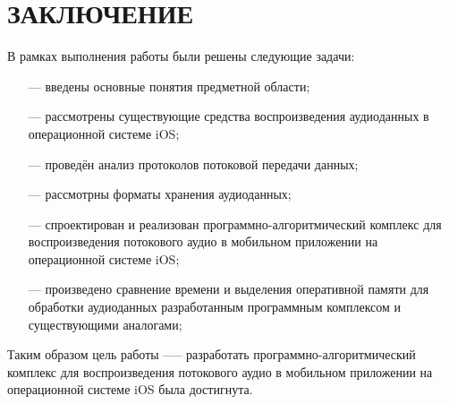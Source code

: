 \setupsectionstar
\section*{ЗАКЛЮЧЕНИЕ}
    \par В рамках выполнения работы были решены следующие задачи:
    \begin{itemize}
        \item[---] введены основные понятия предметной области;
        \item[---] рассмотрены существующие средства воспроизведения аудиоданных в операционной системе iOS;
        \item[---] проведён анализ протоколов потоковой передачи данных;
        \item[---] рассмотрны форматы хранения аудиоданных;
        \item[---] спроектирован и реализован программно-алгоритмический комплекс для воспроизведения потокового аудио в мобильном приложении на операционной системе iOS;
        \item[---] произведено сравнение времени и выделения оперативной памяти для обработки аудиоданных разработанным программным комплексом и существующими аналогами;
    \end{itemize}

    \par Таким образом цель работы —-- разработать программно-алгоритмический комплекс для воспроизведения потокового аудио в мобильном приложении на операционной системе iOS была достигнута.
\pagebreak